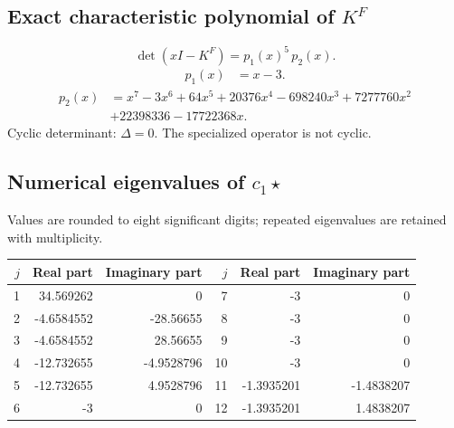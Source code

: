 \documentclass[10pt,a4paper]{article}
\begin{document}
\subsection*{Exact characteristic polynomial of $K^F$}
\[\det(xI-K^F)=p_{1}(x)^{5}\,p_{2}(x).\]
\[\begin{aligned}p_{1}(x)&=x - 3.\end{aligned}\]
\[\begin{aligned}p_{2}(x)&=x^{7} - 3 x^{6} + 64 x^{5} + 20376 x^{4} - 698240 x^{3} + 7277760 x^{2}\\&+22398336 - 17722368 x.\end{aligned}\]
Cyclic determinant: $\Delta=0$. The specialized operator is not cyclic.
\subsection*{Numerical eigenvalues of $c_1\star$}
Values are rounded to eight significant digits; repeated eigenvalues are retained with multiplicity.
\begin{center}\small\begin{tabular}{rrr@{\qquad}rrr}\toprule $j$ & Real part & Imaginary part & $j$ & Real part & Imaginary part\\\midrule
1 & 34.569262 & 0 & 7 & -3 & 0\\
2 & -4.6584552 & -28.56655 & 8 & -3 & 0\\
3 & -4.6584552 & 28.56655 & 9 & -3 & 0\\
4 & -12.732655 & -4.9528796 & 10 & -3 & 0\\
5 & -12.732655 & 4.9528796 & 11 & -1.3935201 & -1.4838207\\
6 & -3 & 0 & 12 & -1.3935201 & 1.4838207\\
\bottomrule\end{tabular}\end{center}
\end{document}
